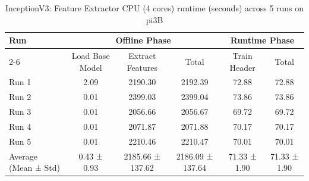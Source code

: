 \begin{table}[t]
\centering
\caption{InceptionV3: Feature Extractor CPU (4 cores) runtime (seconds) across 5 runs on pi3B}
\label{tab:runtime_inceptionv3_CPU4_pi3B}
\begin{tabular}{lccccc}
\hline
\multirow{2}{*}{Run} & \multicolumn{3}{c}{Offline Phase} & \multicolumn{2}{c}{Runtime Phase} \\
\cline{2-6}
 & Load Base Model & Extract Features & Total & Train Header & Total \\
\hline
  Run 1                  & 2.09           & 2190.30        & 2192.39        & 72.88          & 72.88          \\
  Run 2                  & 0.01           & 2399.03        & 2399.04        & 73.86          & 73.86          \\
  Run 3                  & 0.01           & 2056.66        & 2056.67        & 69.72          & 69.72          \\
  Run 4                  & 0.01           & 2071.87        & 2071.88        & 70.17          & 70.17          \\
  Run 5                  & 0.01           & 2210.46        & 2210.47        & 70.01          & 70.01          \\
\hline
  Average (Mean ± Std)   & 0.43 ± 0.93    & 2185.66 ± 137.62 & 2186.09 ± 137.64 & 71.33 ± 1.90   & 71.33 ± 1.90   \\
\hline
\end{tabular}
\end{table}
